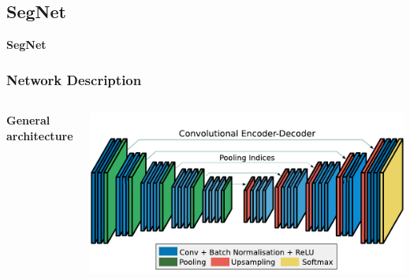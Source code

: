 \documentclass{beamer}
\begin{document}
\begin{frame}
\end{frame}


\subsection{SegNet}

\begin{frame}
\huge{\centerline{\textbf{SegNet}}}
\end{frame}


\begin{frame}
\frametitle{Network Description}

\begin{columns}
\textbf{General architecture}\\


\begin{center}
\includegraphics[scale=0.3]{seg_net.png}
\end{center}
\end{columns}
\begin{columns}


\end{columns}
\end{frame}
\end{document}
